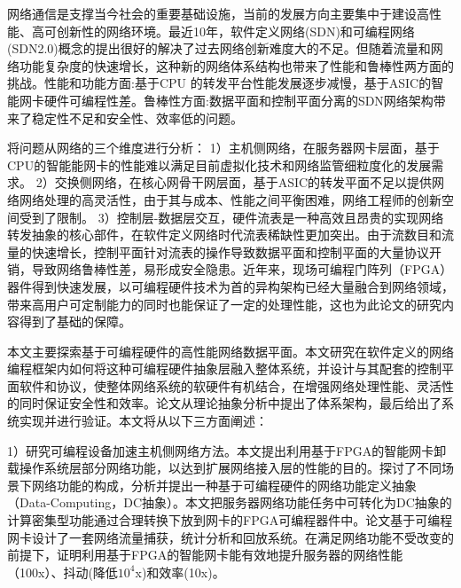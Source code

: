 
\setcounter{page}{1}

%
%
%

网络通信是支撑当今社会的重要基础设施，当前的发展方向主要集中于建设高性能、高可创新性的网络环境。最近10年，软件定义网络(SDN)和可编程网络(SDN2.0)概念的提出很好的解决了过去网络创新难度大的不足。但随着流量和网络功能复杂度的快速增长，这种新的网络体系结构也带来了性能和鲁棒性两方面的挑战。性能和功能方面:基于CPU 的转发平台性能发展逐步减慢，基于ASIC的智能网卡硬件可编程性差。鲁棒性方面:数据平面和控制平面分离的SDN网络架构带来了稳定性不足和安全性、效率低的问题。

将问题从网络的三个维度进行分析：
1）主机侧网络，在服务器网卡层面，基于CPU的智能能网卡的性能难以满足目前虚拟化技术和网络监管细粒度化的发展需求。
2）交换侧网络，在核心网骨干网层面，基于ASIC的转发平面不足以提供网络网络处理的高灵活性，由于其与成本、性能之间平衡困难，网络工程师的创新空间受到了限制。
3）控制层-数据层交互，硬件流表是一种高效且昂贵的实现网络转发抽象的核心部件，在软件定义网络时代流表稀缺性更加突出。由于流数目和流量的快速增长，控制平面针对流表的操作导致数据平面和控制平面的大量协议开销，导致网络鲁棒性差，易形成安全隐患。近年来，现场可编程门阵列（FPGA）器件得到快速发展，以可编程硬件技术为首的异构架构已经大量融合到网络领域，带来高用户可定制能力的同时也能保证了一定的处理性能，这也为此论文的研究内容得到了基础的保障。

本文主要探索基于可编程硬件的高性能网络数据平面。本文研究在软件定义的网络编程框架内如何将这种可编程硬件抽象层融入整体系统，并设计与其配套的控制平面软件和协议，使整体网络系统的软硬件有机结合，在增强网络处理性能、灵活性的同时保证安全性和效率。论文从理论抽象分析中提出了体系架构，最后给出了系统实现并进行验证。本文将从以下三方面阐述：

1）研究可编程设备加速主机侧网络方法。本文提出利用基于FPGA的智能网卡卸载操作系统层部分网络功能，以达到扩展网络接入层的性能的目的。探讨了不同场景下网络功能的构成，分析并提出一种基于可编程硬件的网络功能定义抽象（Data-Computing，DC抽象）。本文把服务器网络功能任务中可转化为DC抽象的计算密集型功能通过合理转换下放到网卡的FPGA可编程器件中。论文基于可编程网卡设计了一套网络流量捕获，统计分析和回放系统。在满足网络功能不受改变的前提下，证明利用基于FPGA的智能网卡能有效地提升服务器的网络性能（100x）、抖动(降低$10^4$x)和效率(10x)。

